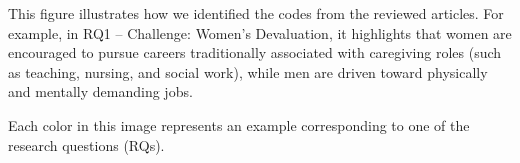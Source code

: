 This figure illustrates how we identified the codes from the reviewed articles. For example, in RQ1 – Challenge: Women’s Devaluation, it highlights that women are encouraged to pursue careers traditionally associated with caregiving roles (such as teaching, nursing, and social work), while men are driven toward physically and mentally demanding jobs.

Each color in this image represents an example corresponding to one of the research questions (RQs).